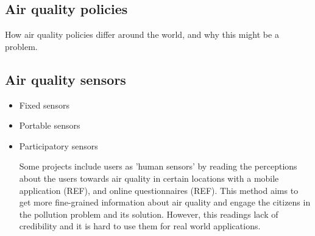 \subsection{Air quality policies}
How air quality policies differ around the world, and why this might be a problem.

\subsection{Air quality sensors}

\begin{itemize}

\item Fixed sensors

\item Portable sensors

\item Participatory sensors

Some projects include users as 'human sensors' by reading the perceptions about the users towards air quality in certain locations with a mobile application (REF), and online questionnaires (REF). This method aims to get more fine-grained information about air quality and engage the citizens in the pollution problem and its solution. However, this readings lack of credibility and it is hard to use them for real world applications.

\end{itemize}



